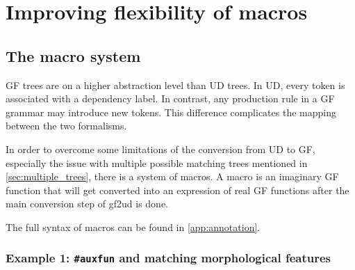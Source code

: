 \chapter{Improving flexibility of macros}\label{sect:flex}
\label{improving-flexibility-macros}


\section{The macro system}


GF trees are on a higher abstraction level than UD trees. In UD, every token is associated with a dependency label. In contrast, any production rule in a GF grammar may introduce new tokens. This difference complicates the mapping between the two formalisms.

In order to overcome some limitations of the conversion from UD to GF, especially the issue with multiple possible matching trees mentioned in \autoref{sec:multiple_trees}, there is a system of macros. A macro is an imaginary GF function that will get converted into an expression of real GF functions after the main conversion step of gf2ud is done.

The full syntax of macros can be found in \autoref{app:annotation}.

\subsection{Example 1: \texttt{\#auxfun} and matching morphological features}

